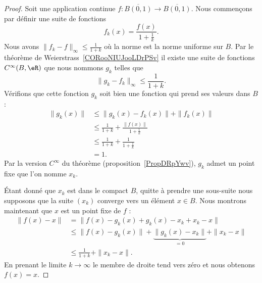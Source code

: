 \begin{proof}
	Soit une application continue \(f \colon \overline{B(0,1)}\to \overline{B(0,1)}  \). Nous commençons par définir une suite de fonctions
	\begin{equation}
		f_k(x)=\frac{ f(x) }{ 1+\frac{1}{ k } }.
	\end{equation}
	Nous avons \( \| f_k-f \|_{\infty}\leq \frac{1}{ 1+k }\) où la norme est la norme uniforme sur \( B\). Par le théorème de Weierstrass~\ref{CORooNIUJooLDrPSv} il existe une suite de fonctions \(  C^{\infty}(B,\eR)\) que nous nommons \( g_k\) telles que
	\begin{equation}
		\|  g_k-f_k\|_{\infty}\leq\frac{1}{ 1+k }.
	\end{equation}
	Vérifions que cette fonction \( g_k\) soit bien une fonction qui prend ses valeurs dans \( B\) :
	\begin{subequations}
		\begin{align}
			\| g_k(x) \| & \leq \| g_k(x)-f_k(x) \|+\| f_k(x) \|                       \\
			             & \leq \frac{1}{ 1+k }+\frac{ \| f(x) \| }{ 1+\frac{1}{ k } } \\
			             & \leq \frac{1}{ 1+k}+\frac{1}{ 1+\frac{1}{ k } }             \\
			             & =1.
		\end{align}
	\end{subequations}
	Par la version \(  C^{\infty}\) du théorème (proposition~\ref{PropDRpYwv}), \( g_k\) admet un point fixe que l'on nomme \( x_k\).

	Étant donné que \( x_k\) est dans le compact \( B\), quitte à prendre une sous-suite nous supposons que la suite \( (x_k)\) converge vers un élément \( x\in B\). Nous montrons maintenant que \( x\) est un point fixe de \( f\) :
	\begin{subequations}
		\begin{align}
			\| f(x)-x \| & =\| f(x)-g_k(x)+g_k(x)-x_k+x_k-x \|                                    \\
			             & \leq \| f(x)-g_k(x) \| +\underbrace{\| g_k(x)-x_k \|}_{=0}+\| x_k-x \| \\
			             & \leq \frac{1}{ 1+k }+\| x_k-x \|.
		\end{align}
	\end{subequations}
	En prenant le limite \( k\to\infty\) le membre de droite tend vers zéro et nous obtenons \( f(x)=x\).
\end{proof}





